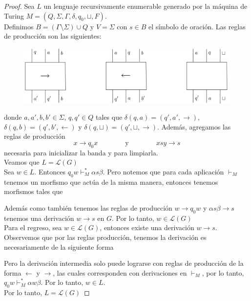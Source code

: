\documentclass[../main.tex]{subfiles}
\begin{document}
\begin{proof}
	Sea $L$ un lenguaje recursivamente enumerable generado por la máquina de Turing $M=(Q, \Sigma, \Gamma, \delta, q_0, \sqcup, F)$. \\
	Definimos $B=(\Gamma \setminus \Sigma ) \cup Q$ y $V= \Sigma$ con $s \in B$ el símbolo de oración. Las reglas de producción son las siguientes: 
	\begin{figure}[H]
		\includegraphics[scale=6.5]{diagrama/turing.png}
		\centering
	\end{figure}
	donde $a,a',b,b' \in \Sigma$, $q,q' \in Q$ tales que $\delta (q, a)=(q',a',\rightarrow)$, $\delta (q, b)=(q',b',\leftarrow)$ y $\delta (q, \sqcup)=(q',\sqcup,\rightarrow)$. Además, agregamos las reglas de producción $$x \to q_0 x \qquad \qquad \text{y} \qquad \qquad xsy \to s$$ 
    necesaria para inicializar la banda y para limpiarla. \\
	Veamos que $L=\mathcal{L}(G)$ \\
	Sea $w \in L$. Entonces $q_0w \vdash_M^* \alpha s \beta$. Pero notemos que para cada aplicación $\vdash_M$ tenemos un morfismo que actúa de la misma manera, entonces tenemos morfismos tales que
	\begin{center}
	\end{center}
	Además como también tenemos las reglas de producción $w \to q_0w$ y $\alpha s \beta \to s$ tenemos una derivación $w \to s$ en $G$. Por lo tanto, $w \in \mathcal{L}(G)$ \\
	Para el regreso, sea $w \in \mathcal{L}(G)$, entonces existe una derivación $w \to s$. \\
	Observemos que por las reglas producción, tenemos la derivación es necesariamente de la siguiente forma
		\begin{center}
		\end{center}
	Pero la derivación intermedia solo puede lograrse con reglas de producción de la forma $\leftarrow$ y $\rightarrow$, las cuales corresponden con derivaciones en $\vdash_M$, por lo tanto, $q_0 w \vdash_M^* \alpha w \beta$. Por lo tanto, $w \in L$.\\
	Por lo tanto, $L=\mathcal{L}(G)$
\end{proof}
\end{document}
